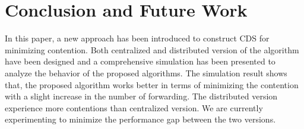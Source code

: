 \section{Conclusion and Future Work}
\label{conclusion}

In this paper, a new approach has been introduced to construct CDS for minimizing contention. Both centralized and distributed version of the algorithm have been designed and a comprehensive simulation has been presented to analyze the behavior of the proposed algorithms. The simulation result shows that, the proposed algorithm works better in terms of minimizing the contention with a slight increase in the number of forwarding.
The distributed version experience more contentions than centralized version. We are currently experimenting to minimize the performance gap between the two versions. \cite{GOLDBERG200249}
